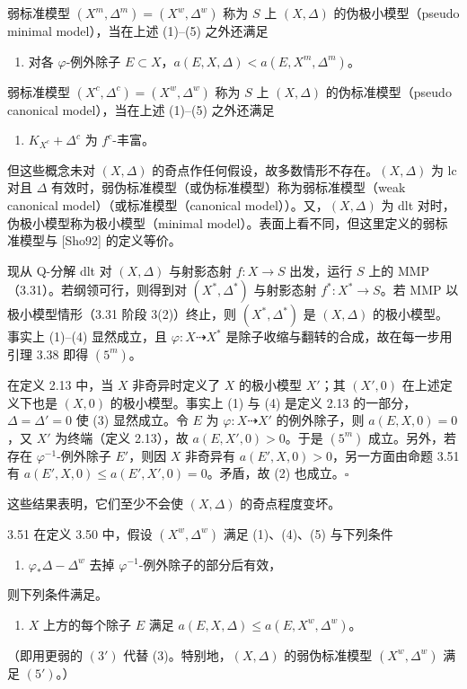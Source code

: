 弱标准模型 $(X^{m},\Delta^{m})=(X^{w},\Delta^{w})$ 称为 $S$ 上 $(X,\Delta)$ 的伪极小模型（pseudo minimal model），当在上述 (1)--(5) 之外还满足
\begin{enumerate}
\item[（$5^{m}$）] 对各 $\varphi$-例外除子 $E\subset X$，$a(E,X,\Delta)<a(E,X^{m},\Delta^{m})$。
\end{enumerate}
弱标准模型 $(X^{c},\Delta^{c})=(X^{w},\Delta^{w})$ 称为 $S$ 上 $(X,\Delta)$ 的伪标准模型（pseudo canonical model），当在上述 (1)--(5) 之外还满足
\begin{enumerate}
\item[（$4^{c}$）] $K_{X^{c}}+\Delta^{c}$ 为 $f^{c}$-丰富。
\end{enumerate}
但这些概念未对 $(X,\Delta)$ 的奇点作任何假设，故多数情形不存在。$(X,\Delta)$ 为 lc 对且 $\Delta$ 有效时，弱伪标准模型（或伪标准模型）称为弱标准模型（weak canonical model）（或标准模型（canonical model））。又，$(X,\Delta)$ 为 dlt 对时，伪极小模型称为极小模型（minimal model）。表面上看不同，但这里定义的弱标准模型与 [Sho92] 的定义等价。

现从 Q-分解 dlt 对 $(X,\Delta)$ 与射影态射 $f:X\to S$ 出发，运行 $S$ 上的 MMP（3.31）。若纲领可行，则得到对 $(X^{*},\Delta^{*})$ 与射影态射 $f^{*}:X^{*}\to S$。若 MMP 以极小模型情形（3.31 阶段 3(2)）终止，则 $(X^{*},\Delta^{*})$ 是 $(X,\Delta)$ 的极小模型。事实上 (1)--(4) 显然成立，且 $\varphi:X\dashrightarrow X^{*}$ 是除子收缩与翻转的合成，故在每一步用引理 3.38 即得 $(5^{m})$。

在定义 2.13 中，当 $X$ 非奇异时定义了 $X$ 的极小模型 $X'$；其 $(X',0)$ 在上述定义下也是 $(X,0)$ 的极小模型。事实上 (1) 与 (4) 是定义 2.13 的一部分，$\Delta=\Delta'=0$ 使 (3) 显然成立。令 $E$ 为 $\varphi:X\dashrightarrow X'$ 的例外除子，则 $a(E,X,0)=0$，又 $X'$ 为终端（定义 2.13），故 $a(E,X',0)>0$。于是 $(5^{m})$ 成立。另外，若存在 $\varphi^{-1}$-例外除子 $E'$，则因 $X$ 非奇异有 $a(E',X,0)>0$，另一方面由命题 3.51 有 $a(E',X,0)\le a(E',X',0)=0$。矛盾，故 (2) 也成立。\hfill$\square$

这些结果表明，它们至少不会使 $(X,\Delta)$ 的奇点程度变坏。

\begin{propositionp}{3.51}
在定义 3.50 中，假设 $(X^{w},\Delta^{w})$ 满足 (1)、(4)、(5) 与下列条件
\begin{enumerate}
\item[（$3'$）] $\varphi_*\Delta-\Delta^{w}$ 去掉 $\varphi^{-1}$-例外除子的部分后有效，
\end{enumerate}
则下列条件满足。
\begin{enumerate}
\item[（$5'$）] $X$ 上方的每个除子 $E$ 满足 $a(E,X,\Delta)\le a(E,X^{w},\Delta^{w})$。
\end{enumerate}
（即用更弱的 $(3')$ 代替 (3)。特别地，$(X,\Delta)$ 的弱伪标准模型 $(X^{w},\Delta^{w})$ 满足 $(5')$。）
\end{propositionp}

